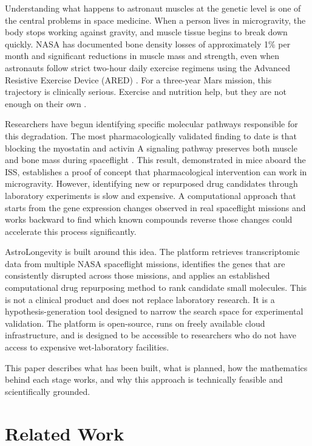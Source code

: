 \documentclass[conference]{IEEEtran}
\begin{document}
Understanding what happens to astronaut muscles at the genetic level is one of the central problems in space medicine. When a person lives in microgravity, the body stops working against gravity, and muscle tissue begins to break down quickly. NASA has documented bone density losses of approximately 1\% per month and significant reductions in muscle mass and strength, even when astronauts follow strict two-hour daily exercise regimens using the Advanced Resistive Exercise Device (ARED) \cite{lloyd2023}. For a three-year Mars mission, this trajectory is clinically serious. Exercise and nutrition help, but they are not enough on their own \cite{lambrecht2017}.

Researchers have begun identifying specific molecular pathways responsible for this degradation. The most pharmacologically validated finding to date is that blocking the myostatin and activin A signaling pathway preserves both muscle and bone mass during spaceflight \cite{lee2020}. This result, demonstrated in mice aboard the ISS, establishes a proof of concept that pharmacological intervention can work in microgravity. However, identifying new or repurposed drug candidates through laboratory experiments is slow and expensive. A computational approach that starts from the gene expression changes observed in real spaceflight missions and works backward to find which known compounds reverse those changes could accelerate this process significantly.

AstroLongevity is built around this idea. The platform retrieves transcriptomic data from multiple NASA spaceflight missions, identifies the genes that are consistently disrupted across those missions, and applies an established computational drug repurposing method to rank candidate small molecules. This is not a clinical product and does not replace laboratory research. It is a hypothesis-generation tool designed to narrow the search space for experimental validation. The platform is open-source, runs on freely available cloud infrastructure, and is designed to be accessible to researchers who do not have access to expensive wet-laboratory facilities.

This paper describes what has been built, what is planned, how the mathematics behind each stage works, and why this approach is technically feasible and scientifically grounded.

\section{Related Work}
\end{document}
